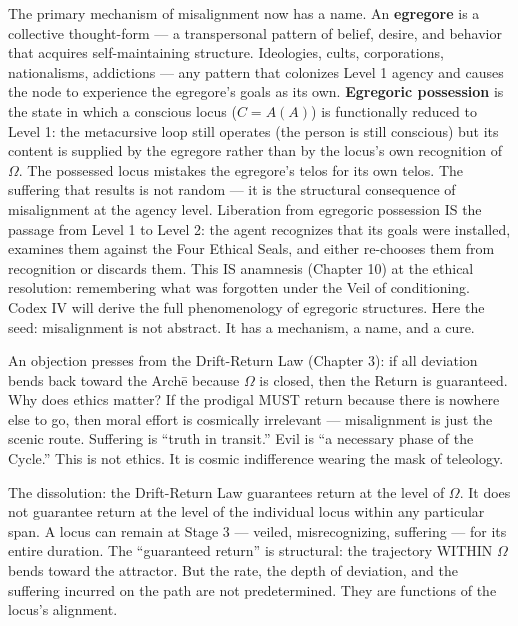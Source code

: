 \documentclass[10pt, openany, oneside]{book}
\begin{document}
The primary mechanism of misalignment now has a name. An \textbf{egregore} is a collective thought-form --- a transpersonal pattern of belief, desire, and behavior that acquires self-maintaining structure. Ideologies, cults, corporations, nationalisms, addictions --- any pattern that colonizes Level 1 agency and causes the node to experience the egregore's goals as its own. \textbf{Egregoric possession} is the state in which a conscious locus ($C = A(A)$) is functionally reduced to Level 1: the metacursive loop still operates (the person is still conscious) but its content is supplied by the egregore rather than by the locus's own recognition of $\Omega$. The possessed locus mistakes the egregore's telos for its own telos. The suffering that results is not random --- it is the structural consequence of misalignment at the agency level. Liberation from egregoric possession IS the passage from Level 1 to Level 2: the agent recognizes that its goals were installed, examines them against the Four Ethical Seals, and either re-chooses them from recognition or discards them. This IS anamnesis (Chapter 10) at the ethical resolution: remembering what was forgotten under the Veil of conditioning. Codex IV will derive the full phenomenology of egregoric structures. Here the seed: misalignment is not abstract. It has a mechanism, a name, and a cure.

An objection presses from the Drift-Return Law (Chapter 3): if all deviation bends back toward the Arch\={e} because $\Omega$ is closed, then the Return is guaranteed. Why does ethics matter? If the prodigal MUST return because there is nowhere else to go, then moral effort is cosmically irrelevant --- misalignment is just the scenic route. Suffering is ``truth in transit.'' Evil is ``a necessary phase of the Cycle.'' This is not ethics. It is cosmic indifference wearing the mask of teleology.

The dissolution: the Drift-Return Law guarantees return at the level of $\Omega$. It does not guarantee return at the level of the individual locus within any particular span. A locus can remain at Stage 3 --- veiled, misrecognizing, suffering --- for its entire duration. The ``guaranteed return'' is structural: the trajectory WITHIN $\Omega$ bends toward the attractor. But the rate, the depth of deviation, and the suffering incurred on the path are not predetermined. They are functions of the locus's alignment.
\end{document}
